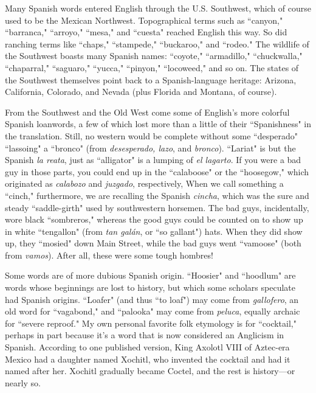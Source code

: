 Many Spanish words entered English through the U.S. Southwest, which of course used to be the Mexican Northwest. Topographical terms such as ``canyon," ``barranca," ``arroyo," ``mesa," and ``cuesta"
reached English this way. So did ranching terms like ``chaps," ``stampede," ``buckaroo," and ``rodeo." The wildlife of the Southwest boasts
many Spanish names: ``coyote," ``armadillo," ``chuckwalla," ``chaparral," ``saguaro," ``yucca," ``pinyon," ``locoweed," and so on. The states
of the Southwest themselves point back to a Spanish-language heritage: Arizona, California, Colorado, and Nevada (plus Florida and Montana, of course).

From the Southwest and the Old West come some of English's
more colorful Spanish loanwords, a few of which lost more than a
little of their ``Spanishness" in the translation. Still, no western would
be complete without some ``desperado" ``lassoing" a ``bronco" (from
\emph{desesperado, lazo}, and \emph{bronco}). ``Lariat" is but the Spanish \emph{la reata},
just as ``alligator" is a lumping of \emph{el lagarto}. If you were a bad guy in
those parts, you could end up in the ``calaboose" or the ``hoosegow,"
which originated as \emph{calabozo} and \emph{juzgado}, respectively, When we
call something a ``cinch," furthermore, we are recalling the Spanish
\emph{cincha}, which was the sure and steady ``saddle-girth" used by southwestern horsemen. The bad guys, incidentally, wore black ``sombreros,"
whereas the good guys could be counted on to show up in white ``tengallon" (from \emph{tan galán}, or ``so gallant") hats. When they did show up,
they ``mosied" down Main Street, while the bad guys went ``vamoose"
(both from \emph{vamos}). After all, these were some tough hombres!

Some words are of more dubious Spanish origin. ``Hoosier" and
``hoodlum" are words whose beginnings are lost to history, but which
some scholars speculate had Spanish origins. ``Loafer" (and thus ``to
loaf") may come from \emph{gallofero}, an old word for ``vagabond," and ``palooka" may come from \emph{peluca}, equally archaic for ``severe reproof."
My own personal favorite folk etymology is for ``cocktail," perhaps in
part because it's a word that is now considered an Anglicism in Spanish. According to one published version, King Axolotl VIII of Aztec-era
Mexico had a daughter named Xochitl, who invented the cocktail and
had it named after her. Xochitl gradually became Coctel, and the rest is
history---or nearly so.

